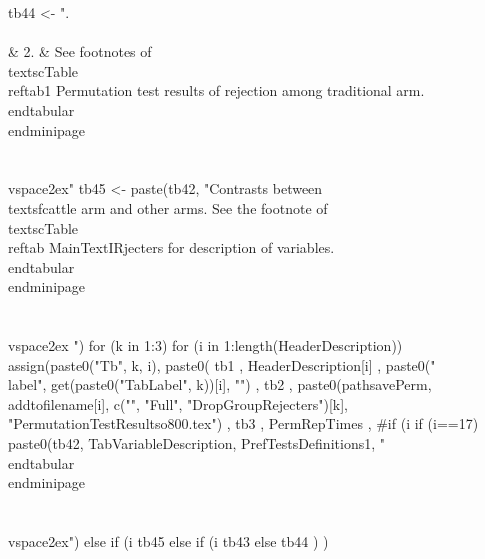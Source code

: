 \begin{Schunk}
\begin{Sinput}
tb44 <- ".\\\\& 2. &  See footnotes of \\textsc{Table \\ref{tab1 Permutation test results of rejection among traditional arm}}. \\end{tabular}\\end{minipage}\\\\\\vspace{2ex}"
tb45 <- paste(tb42, "Contrasts between \\textsf{cattle} arm and other arms. See the footnote of \\textsc{Table \\ref{tab MainTextIRjecters}} for description of variables. \\end{tabular}\\end{minipage}\\\\\\vspace{2ex} ")
for (k in 1:3) 
  for (i in 1:length(HeaderDescription))
    assign(paste0("Tb", k, i), 
      paste0(
        tb1
        , 
        HeaderDescription[i]
        ,
        paste0("\\label{", get(paste0("TabLabel", k))[i], "}")
        ,
        tb2
        , 
        paste0(pathsavePerm, addtofilename[i], c("", "Full", "DropGroupRejecters")[k],
          "PermutationTestResultso800.tex")
        , 
        tb3
        ,
        PermRepTimes
        ,
        #if (i %in% c(1, 5, 11, 17, 21, 25)) tb42 else tb41
        if (i==17) 
          paste0(tb42, TabVariableDescription, PrefTestsDefinitions1, "\\end{tabular}\\end{minipage}\\\\\\vspace{2ex}") else 
        if (i %in% grep("non-catt", HeaderDescription)) # 30, 32 
          tb45 else 
        if (i %in% c(1, 5, 11, 18, 21, 25)) 
          tb43 else 
          tb44
        )
      )
\end{Sinput}
\end{Schunk}

